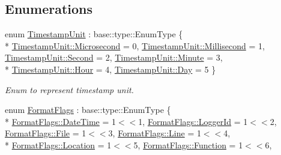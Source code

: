 \subsection*{Enumerations}
\begin{DoxyCompactItemize}
\item 
enum \hyperlink{namespaceel_1_1base_a1b886858c6409097395b24b1bdf03c39}{Timestamp\+Unit} \+: base\+::type\+::\+Enum\+Type \{ \\*
\hyperlink{namespaceel_1_1base_a1b886858c6409097395b24b1bdf03c39a1f14b3811ca5de688daa740d8471249e}{Timestamp\+Unit\+::\+Microsecond} = 0, 
\hyperlink{namespaceel_1_1base_a1b886858c6409097395b24b1bdf03c39a988bbeeb80e7e0a6b4651aab5a76b413}{Timestamp\+Unit\+::\+Millisecond} = 1, 
\hyperlink{namespaceel_1_1base_a1b886858c6409097395b24b1bdf03c39ac22cf8376b1893dcfcef0649fe1a7d87}{Timestamp\+Unit\+::\+Second} = 2, 
\hyperlink{namespaceel_1_1base_a1b886858c6409097395b24b1bdf03c39a62902641c38f3a4a8eb3212454360e24}{Timestamp\+Unit\+::\+Minute} = 3, 
\\*
\hyperlink{namespaceel_1_1base_a1b886858c6409097395b24b1bdf03c39ab55e509c697e4cca0e1d160a7806698f}{Timestamp\+Unit\+::\+Hour} = 4, 
\hyperlink{namespaceel_1_1base_a1b886858c6409097395b24b1bdf03c39a03727ac48595a24daed975559c944a44}{Timestamp\+Unit\+::\+Day} = 5
 \}
\begin{DoxyCompactList}\small\item\em Enum to represent timestamp unit. \end{DoxyCompactList}\item 
enum \hyperlink{namespaceel_1_1base_a28939c5a884e67fcf12259f4b8848e00}{Format\+Flags} \+: base\+::type\+::\+Enum\+Type \{ \\*
\hyperlink{namespaceel_1_1base_a28939c5a884e67fcf12259f4b8848e00a8cf10d2341ed01492506085688270c1e}{Format\+Flags\+::\+Date\+Time} = 1$<$$<$1, 
\hyperlink{namespaceel_1_1base_a28939c5a884e67fcf12259f4b8848e00a1bfb431e0c673464b7a57c135e5fe861}{Format\+Flags\+::\+Logger\+Id} = 1$<$$<$2, 
\hyperlink{namespaceel_1_1base_a28939c5a884e67fcf12259f4b8848e00a0b27918290ff5323bea1e3b78a9cf04e}{Format\+Flags\+::\+File} = 1$<$$<$3, 
\hyperlink{namespaceel_1_1base_a28939c5a884e67fcf12259f4b8848e00a4803e6b9e63dabf04de980788d6a13c4}{Format\+Flags\+::\+Line} = 1$<$$<$4, 
\\*
\hyperlink{namespaceel_1_1base_a28939c5a884e67fcf12259f4b8848e00ace5bf551379459c1c61d2a204061c455}{Format\+Flags\+::\+Location} = 1$<$$<$5, 
\hyperlink{namespaceel_1_1base_a28939c5a884e67fcf12259f4b8848e00a86408593c34af77fdd90df932f8b5261}{Format\+Flags\+::\+Function} = 1$<$$<$6, 

\end{DoxyCompactItemize}
